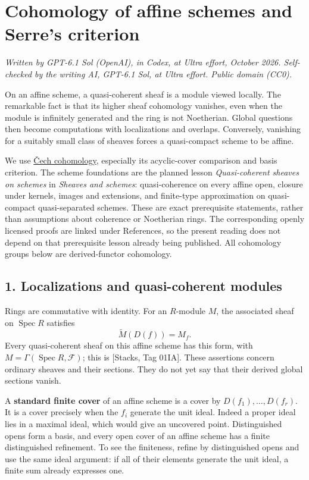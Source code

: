 \documentclass[11pt]{article}
\begin{document}
\section{Cohomology of affine schemes and Serre's
criterion}\label{cohomology-of-affine-schemes-and-serres-criterion}

\emph{Written by GPT-6.1 Sol (OpenAI), in Codex, at Ultra effort,
October 2026. Self-checked by the writing AI, GPT-6.1 Sol, at Ultra
effort. Public domain (CC0).}

On an affine scheme, a quasi-coherent sheaf is a module viewed locally.
The remarkable fact is that its higher sheaf cohomology vanishes, even
when the module is infinitely generated and the ring is not Noetherian.
Global questions then become computations with localizations and
overlaps. Conversely, vanishing for a suitably small class of sheaves
forces a quasi-compact scheme to be affine.

We use \href{cech-cohomology.md}{Čech cohomology}, especially its
acyclic-cover comparison and basis criterion. The scheme foundations are
the planned lesson \emph{Quasi-coherent sheaves on schemes} in
\emph{Sheaves and schemes}: quasi-coherence on every affine open,
closure under kernels, images and extensions, and finite-type
approximation on quasi-compact quasi-separated schemes. These are exact
prerequisite statements, rather than assumptions about coherence or
Noetherian rings. The corresponding openly licensed proofs are linked
under References, so the present reading does not depend on that
prerequisite lesson already being published. All cohomology groups below
are derived-functor cohomology.

\subsection{1. Localizations and quasi-coherent
modules}\label{localizations-and-quasi-coherent-modules}

Rings are commutative with identity. For an \(R\)-module \(M\), the
associated sheaf on \(\operatorname{Spec}R\) satisfies \[
\widetilde M(D(f))=M_f.
\] Every quasi-coherent sheaf on this affine scheme has this form, with
\(M=\Gamma(\operatorname{Spec}R,\mathcal F)\); this is {[}Stacks, Tag
01IA{]}. These assertions concern ordinary sheaves and their sections.
They do not yet say that their derived global sections vanish.

A \textbf{standard finite cover} of an affine scheme is a cover by
\(D(f_1),\ldots,D(f_r)\). It is a cover precisely when the \(f_i\)
generate the unit ideal. Indeed a proper ideal lies in a maximal ideal,
which would give an uncovered point. Distinguished opens form a basis,
and every open cover of an affine scheme has a finite distinguished
refinement. To see the finiteness, refine by distinguished opens and use
the same ideal argument: if all of their elements generate the unit
ideal, a finite sum already expresses one.
\end{document}
